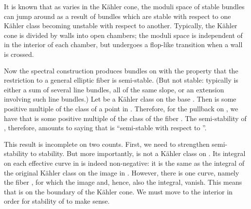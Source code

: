 \documentclass[a4paper,12pt]{article}
\numberwithin{equation}{section}
\theoremstyle{plain}
\begin{document}
It is known that as \myHighlight{$\omega$}\coordHE{} varies in the K\"{a}hler cone, the moduli space of stable
bundles can jump around as a result of bundles which are stable with
respect to one K\"{a}hler class becoming unstable with respect to another.
Typically, the K\"{a}hler cone is divided by walls into open chambers; the
moduli space is independent of \myHighlight{$\omega$}\coordHE{} in the interior of each chamber, but
undergoes a flop-like transition when a wall is crossed.

Now the spectral construction \cite{FMW1,AJ} produces bundles \coordHE{} on \coordHE{} with the
property that the restriction \coordHE{} to a general elliptic fiber
\coordHE{} is semi-stable. (But not stable: typically \coordHE{} is 
either a sum of several line bundles, all of the same slope, or an
extension involving such line bundles.) Let \coordHE{} be a K\"{a}hler class on the
base \coordHE{}. Then \coordHE{} is some positive multiple of the class of a point
in \coordHE{}. Therefore, for the pullback \coordHE{} on \coordHE{}, we have that
\coordHE{} is some positive multiple of the class of the fiber \coordHE{}. The
semi-stability of \coordHE{}, therefore, amounts to saying that \coordHE{} is
``semi-stable with respect to \coordHE{}''.

This result is incomplete on two counts. First, we need to strengthen
semi-stability to stability. But more importantly, \coordHE{} is not
a K\"{a}hler class on \coordHE{}. Its integral on each effective curve \coordHE{} in \coordHE{}
is indeed non-negative: it is the same as the integral of the original
K\"{a}hler class \coordHE{} on the image \coordHE{} in \coordHE{}. However, there is one
curve, namely the fiber \coordHE{}, for which the image \coordHE{} and, hence, also 
the integral, vanish. This means that \coordHE{} is on the boundary of
the K\"{a}hler cone. We must move to the interior in order for stability of
\coordHE{} to make sense.
\end{document}
